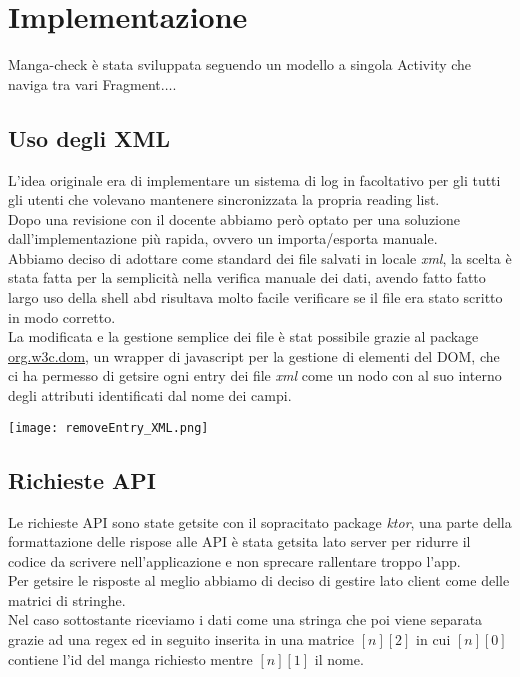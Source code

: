 \documentclass[../Assignment-3-LPSMT.tex]{subfiles}
\begin{document}
\chapter{Implementazione}

Manga-check è stata sviluppata seguendo un modello a singola Activity che naviga tra vari Fragment$\dots$.\\

\section{Uso degli XML}

L'idea originale era di implementare un sistema di log in facoltativo per gli tutti gli utenti che volevano mantenere sincronizzata la propria reading list.\\
Dopo una revisione con il docente abbiamo però optato per una soluzione dall'implementazione più rapida, ovvero un importa/esporta manuale.\\
Abbiamo deciso di adottare come standard dei file salvati in locale \emph{xml}, la scelta è stata fatta per la semplicità nella verifica manuale dei dati, avendo fatto fatto largo uso della shell abd risultava molto facile verificare se il file era stato scritto in modo corretto.\\
La modificata e la gestione semplice dei file è stat possibile grazie al package \href{https://kotlinlang.org/api/latest/jvm/stdlib/org.w3c.dom/}{org.w3c.dom}, un wrapper di javascript per la gestione di elementi del DOM, che ci ha permesso di getsire ogni entry dei file \emph{xml} come un nodo con al suo interno degli attributi identificati dal nome dei campi.

\begin{center}
  \texttt{[image: removeEntry\_XML.png]}
\end{center}

\section{Richieste API}

Le richieste API sono state getsite con il sopracitato package \emph{ktor}, una parte della formattazione delle rispose alle API è stata getsita lato server per ridurre il codice da scrivere nell'applicazione e non sprecare rallentare troppo l'app.\\
Per getsire le risposte al meglio abbiamo di deciso di gestire lato client come delle matrici di stringhe.\\
Nel caso sottostante riceviamo i dati come una stringa che poi viene separata grazie ad una regex ed in seguito inserita in una matrice $[n][2]$ in cui $[n][0]$ contiene l'id del manga richiesto mentre $[n][1]$ il nome.
\end{document}
